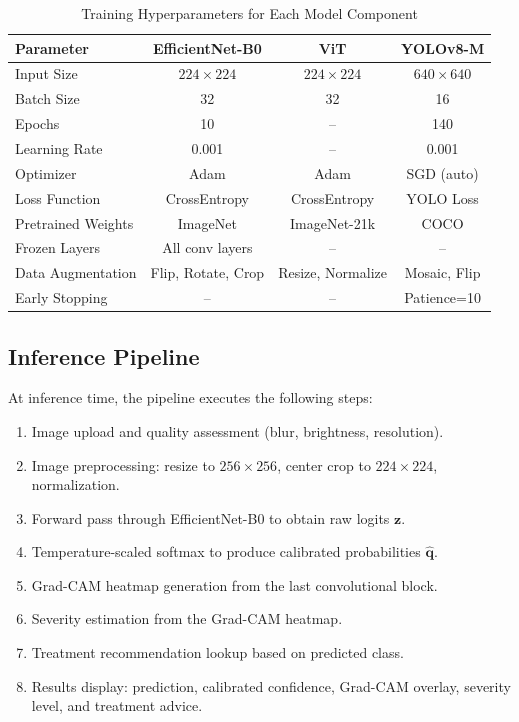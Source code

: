 \documentclass[conference]{IEEEtran}
\begin{document}
\begin{table}[htbp]
\caption{Training Hyperparameters for Each Model Component}
\label{tab:training_config}
\centering
\renewcommand{\arraystretch}{1.15}
\begin{tabular}{@{}lccc@{}}
\toprule
\textbf{Parameter} & \textbf{EfficientNet-B0} & \textbf{ViT} & \textbf{YOLOv8-M} \\
\midrule
Input Size          & $224 \times 224$ & $224 \times 224$ & $640 \times 640$ \\
Batch Size          & 32               & 32               & 16 \\
Epochs              & 10               & --               & 140 \\
Learning Rate       & 0.001            & --               & 0.001 \\
Optimizer           & Adam             & Adam             & SGD (auto) \\
Loss Function       & CrossEntropy     & CrossEntropy     & YOLO Loss \\
Pretrained Weights  & ImageNet         & ImageNet-21k     & COCO \\
Frozen Layers       & All conv layers  & --               & -- \\
Data Augmentation   & Flip, Rotate, Crop & Resize, Normalize & Mosaic, Flip \\
Early Stopping      & --               & --               & Patience=10 \\
\bottomrule
\end{tabular}
\end{table}

\subsection{Inference Pipeline}

At inference time, the pipeline executes the following steps:
\begin{enumerate}
    \item Image upload and quality assessment (blur, brightness, resolution).
    \item Image preprocessing: resize to $256 \times 256$, center crop to $224 \times 224$, normalization.
    \item Forward pass through EfficientNet-B0 to obtain raw logits $\mathbf{z}$.
    \item Temperature-scaled softmax to produce calibrated probabilities $\hat{\mathbf{q}}$.
    \item Grad-CAM heatmap generation from the last convolutional block.
    \item Severity estimation from the Grad-CAM heatmap.
    \item Treatment recommendation lookup based on predicted class.
    \item Results display: prediction, calibrated confidence, Grad-CAM overlay, severity level, and treatment advice.
\end{enumerate}
\end{document}
